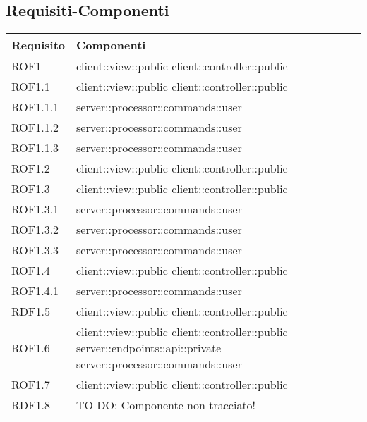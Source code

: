 \subsection{Requisiti-Componenti} %
\label{sub:componenti_requisiti}
\begin{center}
\def\arraystretch{1.5}
\bgroup
\begin{longtable}{| p{4cm} | p{8cm} |}
\hline
\textbf{Requisito} & \textbf{Componenti} \\
\hline
ROF1 & client::view::public \newline client::controller::public \\
\hline
ROF1.1 & client::view::public \newline client::controller::public \\
\hline
ROF1.1.1 & server::processor::commands::user \\
\hline
ROF1.1.2 & server::processor::commands::user \\
\hline
ROF1.1.3 & server::processor::commands::user \\
\hline
ROF1.2 & client::view::public \newline client::controller::public \\
\hline
ROF1.3 & client::view::public \newline client::controller::public \\
\hline
ROF1.3.1 & server::processor::commands::user \\
\hline
ROF1.3.2 & server::processor::commands::user \\
\hline
ROF1.3.3 & server::processor::commands::user \\
\hline
ROF1.4 & client::view::public \newline client::controller::public \\
\hline
ROF1.4.1 & server::processor::commands::user \\
\hline
RDF1.5 & client::view::public \newline client::controller::public \\
\hline
ROF1.6 & client::view::public \newline client::controller::public \newline server::endpoints::api::private \newline server::processor::commands::user \\
\hline
ROF1.7 & client::view::public \newline client::controller::public \\
\hline
RDF1.8 & TO DO: Componente non tracciato! \\

\end{longtable}
\end{center}
